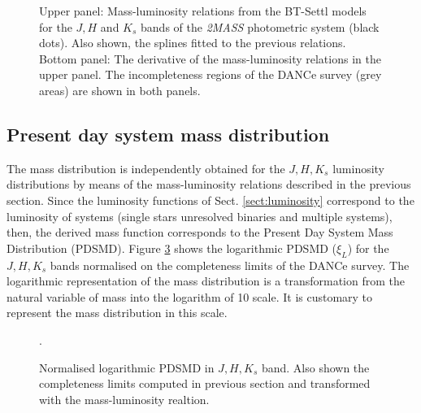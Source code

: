\begin{figure}[ht!]
\begin{subfigure}[t]{0.7\textwidth}
        \caption{}
        \label{fig:der_splineML}
    \end{subfigure}
\caption{Upper panel: Mass-luminosity relations from the BT-Settl models \citep{Allard2012} for the $J, H$ and $K_s$ bands of the \emph{2MASS} photometric system (black dots). Also shown, the splines fitted to the previous relations. Bottom panel: The derivative of the mass-luminosity relations in the upper panel. The incompleteness regions of the DANCe survey (grey areas) are shown in both panels.}
\label{fig:ML}
\end{figure}

\subsection{Present day system mass distribution}

The mass distribution is independently obtained for the $J,H,K_s$ luminosity distributions by means of the mass-luminosity relations described in the previous section. Since the luminosity functions of Sect. \ref{sect:luminosity} correspond to the luminosity of systems (single stars unresolved binaries and multiple systems), then, the derived mass function corresponds to the Present Day System Mass Distribution (PDSMD).  Figure \ref{fig:MassDistribution} shows the logarithmic PDSMD ($\xi_L$) for the $J,H,K_s$ bands normalised on the completeness limits of the DANCe survey. The logarithmic representation of the mass distribution is a transformation from the natural variable of mass into the logarithm of 10 scale. It is customary to represent the mass distribution in this scale.

\begin{figure}[htbp]
\begin{center}
\caption{Normalised logarithmic PDSMD in $J,H,K_s$ band. Also shown the completeness limits computed in previous section and transformed with the mass-luminosity realtion.}
\label{fig:MassDistribution}.
\end{center}
\end{figure}

